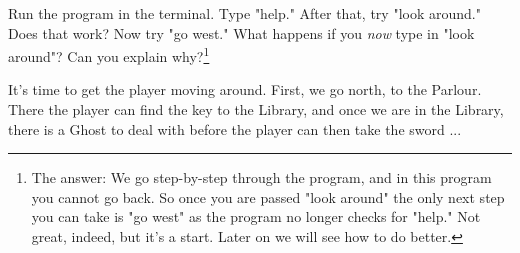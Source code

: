 \begin{Exe}
Run the program in the terminal. Type "help." After that, try "look around." Does that work? Now try "go west." What happens if you \emph{now} type in "look around"? Can you explain why?\footnote{The answer: We go step-by-step through the program, and in this program you cannot go back. So once you are passed "look around" the only next step you can take is "go west" as the program no longer checks for "help." Not great, indeed, but it's a start. Later on we will see how to do better.} \expend
\end{Exe}

It's time to get the player moving around. First, we go north, to the Parlour. There the player can find the key to the Library, and once we are in the Library, there is a Ghost to deal with before the player can then take the sword ... 


 



  